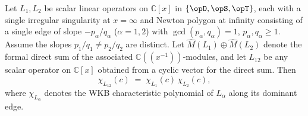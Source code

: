 



\begin{lemma}\label{lem:chi-multiplicative}
Let $L_1, L_2$ be scalar linear operators on $\mathbb{C}[x]$ in
$\{\opD, \opS, \opT\}$, each with a single irregular singularity at
$x = \infty$ and Newton polygon at infinity consisting of a single
edge of slope $-p_\alpha / q_\alpha$ ($\alpha = 1, 2$) with
$\gcd(p_\alpha, q_\alpha) = 1$, $p_\alpha, q_\alpha \ge 1$. Assume the
slopes $p_1/q_1 \ne p_2/q_2$ are distinct. Let $\widehat{M}(L_1) \oplus
\widehat{M}(L_2)$ denote the formal direct sum of the associated
$\mathbb{C}((x^{-1}))$-modules, and let $L_{12}$ be any scalar operator
on $\mathbb{C}[x]$ obtained from a cyclic vector for the direct sum.
Then
\[
   \chi_{L_{12}}(c) \;=\; \chi_{L_1}(c)\, \chi_{L_2}(c),
\]
where $\chi_{L_\alpha}$ denotes the WKB characteristic polynomial of
$L_\alpha$ along its dominant edge.
\end{lemma}

